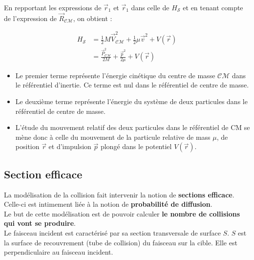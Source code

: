 \documentclass[12pt,a4paper,oneside,french]{book}
\theoremstyle{definition}
\theoremstyle{definition}
\theoremstyle{definition}
\theoremstyle{remark}
\theoremstyle{definition}
\begin{document}
    En repportant les expressions de ${\vec{r}}_{1}$ et ${\vec{r}}_{1}$ dans celle de ${H}_{\mathcal{S}}$ et en tenant compte de l'expression de ${\vec{R}}_{\mathcal{CM}}$, on obtient :
    
    \begin{equation*}
    \begin{split}
        {H}_{\mathcal{S}}
            &= \frac{1}{2} M {\vec{V}}_{\mathcal{CM}}^{2} + \frac{1}{2} \mu {\vec{v}}^{2} + V(\vec{r}) \\
            &= \frac{{\vec{P}}_{\mathcal{CM}}^{2}}{2 M} + \frac{{\vec{p}}^{2}}{2 \mu} + V(\vec{r})
    \end{split}
    \end{equation*}
    
    \begin{itemize}
        \itemsep1em
        
        \item 
        Le premier terme représente l'énergie cinétique du centre de masse $\mathcal{CM}$ dans le référentiel d'inertie. Ce terme est nul dans le référentiel de centre de masse.
        
        \item
        Le deuxième terme représente l'énergie du système de deux particules dans le référentiel de centre de masse.
        
        \item
        L'étude du mouvement relatif des deux particules dans le référentiel de CM se mène donc à celle du mouvement de la particule relative de mass $\mu$, de position $\vec{r}$ et d'impulsion $\vec{p}$ plongé dans le potentiel $V(\vec{r})$.
    \end{itemize}
    
    \subsection{Section efficace}
    La modélisation de la collision fait intervenir la notion de \textbf{sections efficace}. Celle-ci est intimement liée à la notion de \textbf{probabilité de diffusion}. \\
    
    Le but de cette modélisation est de pouvoir calculer \textbf{le nombre de collisions qui vont se produire}. \\
    
    Le faisceau incident est caractérisé par sa section transversale de surface $S$. $S$ est la surface de recouvrement (tube de collision) du faisceau sur la cible. Elle est perpendiculaire au faisceau incident. \\
    
\end{document}
